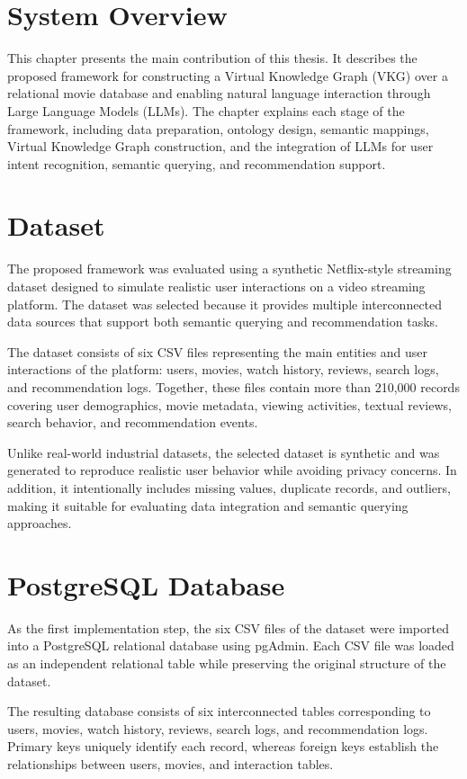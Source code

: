 
\section{System Overview}

This chapter presents the main contribution of this thesis. It describes the proposed framework for constructing a Virtual Knowledge Graph (VKG) over a relational movie database and enabling natural language interaction through Large Language Models (LLMs). The chapter explains each stage of the framework, including data preparation, ontology design, semantic mappings, Virtual Knowledge Graph construction, and the integration of LLMs for user intent recognition, semantic querying, and recommendation support.
\section{Dataset}
The proposed framework was evaluated using a synthetic Netflix-style streaming dataset designed to simulate realistic user interactions on a video streaming platform. The dataset was selected because it provides multiple interconnected data sources that support both semantic querying and recommendation tasks.

The dataset consists of six CSV files representing the main entities and user interactions of the platform: users, movies, watch history, reviews, search logs, and recommendation logs. Together, these files contain more than 210,000 records covering user demographics, movie metadata, viewing activities, textual reviews, search behavior, and recommendation events.

Unlike real-world industrial datasets, the selected dataset is synthetic and was generated to reproduce realistic user behavior while avoiding privacy concerns. In addition, it intentionally includes missing values, duplicate records, and outliers, making it suitable for evaluating data integration and semantic querying approaches.
\section{PostgreSQL Database}
As the first implementation step, the six CSV files of the dataset were imported into a PostgreSQL relational database using pgAdmin. Each CSV file was loaded as an independent relational table while preserving the original structure of the dataset.

The resulting database consists of six interconnected tables corresponding to users, movies, watch history, reviews, search logs, and recommendation logs. Primary keys uniquely identify each record, whereas foreign keys establish the relationships between users, movies, and interaction tables.

